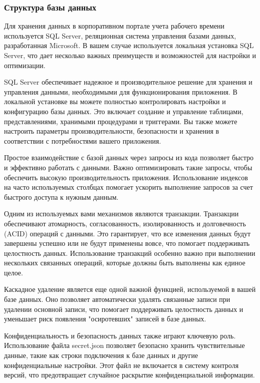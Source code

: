 \subsubsection{Структура базы данных}

Для хранения данных в корпоративном портале учета рабочего времени используется SQL Server, реляционная система управления базами данных, разработанная Microsoft. В вашем случае используется локальная установка SQL Server, что дает несколько важных преимуществ и возможностей для настройки и оптимизации.

SQL Server обеспечивает надежное и производительное решение для хранения и управления данными, необходимыми для функционирования приложения. В локальной установке вы можете полностью контролировать настройки и конфигурацию базы данных. Это включает создание и управление таблицами, представлениями, хранимыми процедурами и триггерами. Вы также можете настроить параметры производительности, безопасности и хранения в соответствии с потребностями вашего приложения.

Простое взаимодействие с базой данных через запросы из кода позволяет быстро и эффективно работать с данными. Важно оптимизировать такие запросы, чтобы обеспечить высокую производительность приложения. Использование индексов на часто используемых столбцах помогает ускорить выполнение запросов за счет быстрого доступа к нужным данным.

Одним из используемых вами механизмов являются транзакции. Транзакции обеспечивают атомарность, согласованность, изолированность и долговечность (ACID) операций с данными. Это гарантирует, что все изменения данных будут завершены успешно или не будут применены вовсе, что помогает поддерживать целостность данных. Использование транзакций особенно важно при выполнении нескольких связанных операций, которые должны быть выполнены как единое целое.

Каскадное удаление является еще одной важной функцией, используемой в вашей базе данных. Оно позволяет автоматически удалять связанные записи при удалении основной записи, что помогает поддерживать целостность данных и уменьшает риск появления "осиротевших" записей в базе данных.

Конфиденциальность и безопасность данных также играют ключевую роль. Использование файла secret.json позволяет безопасно хранить чувствительные данные, такие как строки подключения к базе данных и другие конфиденциальные настройки. Этот файл не включается в систему контроля версий, что предотвращает случайное раскрытие конфиденциальной информации.

